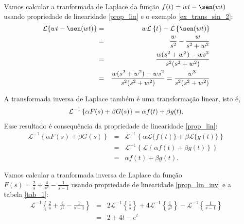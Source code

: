 \begin{ex}Vamos calcular a tranformada de Laplace da função $f(t)=wt-\sen(wt)$ usando propriedade de linearidade \ref{prop_lin} e o exemplo \ref{ex_trans_sin_2}:
\begin{eqnarray*}
\mathcal{L }\{wt-\sen(wt)\}&=& w\mathcal{L }\left\{ t\right\}- \mathcal{L }\left\{ \sen(wt)\right\}\\
&=&\frac{w}{s^2}-\frac{w}{s^2+w^2}\\
&=&\frac{w(s^2+w^2)-ws^2}{s^2(s^2+w^2)}\\
&=&\frac{w(s^2+w^2)-ws^2}{s^2(s^2+w^2)}=\frac{w^3}{s^2(s^2+w^2)}\\
\end{eqnarray*}
\end{ex}
\begin{obs}A transformada inversa de Laplace também é uma transformação linear, isto é,
\begin{equation}{\label{prop_lin_inv}}
\mathcal{L }^{-1}\left\{\alpha F(s)+\beta G(s)\right\}=\alpha f(t)+\beta g(t).
\end{equation}
Esse resultado é consequência da propriedade de linearidade \ref{prop_lin}:
\begin{eqnarray*}
\mathcal{L }^{-1}\left\{\alpha F(s)+\beta G(s)\right\}&=&\mathcal{L }^{-1}\left\{\alpha \mathcal{L}\{f(t)\}+\beta \mathcal{L}\{g(t)\}\right\}\\
&=&\mathcal{L }^{-1}\left\{\mathcal{L}\left\{\alpha f(t)+\beta g(t)\right\}\right\}\\
&=&\alpha  f(t)+\beta g(t).
\end{eqnarray*}
\end{obs}
\begin{ex}Vamos calcular a tranformada inversa de Laplace da função $F(s)=\frac{2}{s}+\frac{4}{s^2}-\frac{1}{s-1}$ usando propriedade de linearidade \ref{prop_lin_inv} e a tabela \ref{tab_1}:
\begin{eqnarray*}
\mathcal{L }^{-1}\left\{\frac{2}{s}+\frac{4}{s^2}-\frac{1}{s-1}\right\}&=& 2\mathcal{L }^{-1}\left\{\frac{1}{s}\right\}+4\mathcal{L }^{-1}\left\{\frac{1}{s^2}\right\}-\mathcal{L }^{-1}\left\{\frac{1}{s-1}\right\}\\
&=&2+4t-e^t
\end{eqnarray*}
\end{ex}

